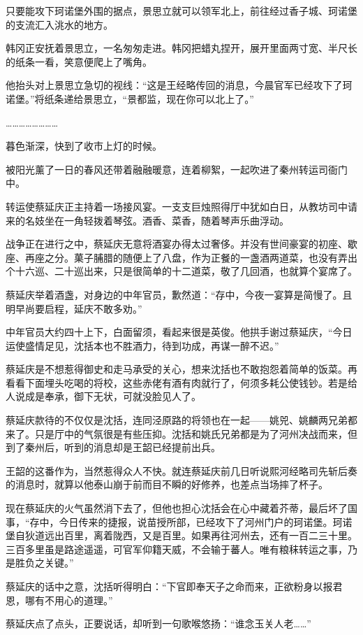 只要能攻下珂诺堡外围的据点，景思立就可以领军北上，前往经过香子城、珂诺堡的支流汇入洮水的地方。

韩冈正安抚着景思立，一名匆匆走进。韩冈把蜡丸捏开，展开里面两寸宽、半尺长的纸条一看，笑意便爬上了嘴角。

他抬头对上景思立急切的视线：“这是王经略传回的消息，今晨官军已经攻下了珂诺堡。”将纸条递给景思立，“景都监，现在你可以北上了。”

……………………

暮色渐深，快到了收市上灯的时候。

被阳光薰了一日的春风还带着融融暖意，连着柳絮，一起吹进了秦州转运司衙门中。

转运使蔡延庆正主持着一场接风宴。一支支巨烛照得厅中犹如白日，从教坊司中请来的名妓坐在一角轻拨着琴弦。酒香、菜香，随着琴声乐曲浮动。

战争正在进行之中，蔡延庆无意将酒宴办得太过奢侈。并没有世间豪宴的初座、歇座、再座之分。菓子脯腊的随便上了八盘，作为正餐的一盏酒两道菜，也没有弄出个十六巡、二十巡出来，只是很简单的十二道菜，敬了几回酒，也就算个宴席了。

蔡延庆举着酒盏，对身边的中年官员，歉然道：“存中，今夜一宴算是简慢了。且明早尚要启程，延庆不敢多劝。”

中年官员大约四十上下，白面留须，看起来很是英俊。他拱手谢过蔡延庆，“今日运使盛情足见，沈括本也不胜酒力，待到功成，再谋一醉不迟。”

蔡延庆是不想惹得御史和走马承受的关心，想来沈括也不敢抱怨着简单的饭菜。再看看下面埋头吃喝的将校，这些赤佬有酒有肉就行了，何须多耗公使钱钞。若是给人说成是奉承，御下无状，可就没脸见人了。

蔡延庆款待的不仅仅是沈括，连同泾原路的将领也在一起——姚兕、姚麟两兄弟都来了。只是厅中的气氛很是有些压抑。沈括和姚氏兄弟都是为了河州决战而来，但到了秦州后，听到的消息却是王韶已经提前出兵。

王韶的这番作为，当然惹得众人不快。就连蔡延庆前几日听说熙河经略司先斩后奏的消息时，就算以他泰山崩于前而目不瞬的好修养，也差点当场摔了杯子。

现在蔡延庆的火气虽然消下去了，但他也担心沈括会在心中藏着芥蒂，最后坏了国事，“存中，今日传来的捷报，说苗授所部，已经攻下了河州门户的珂诺堡。珂诺堡自狄道远出百里，离着陇西，又是百里。如果再往河州去，还有一百二三十里。三百多里虽是路途遥遥，可官军仰籍天威，不会输于蕃人。唯有粮秣转运之事，乃是胜负之关键。”

蔡延庆的话中之意，沈括听得明白：“下官即奉天子之命而来，正欲粉身以报君恩，哪有不用心的道理。”

蔡延庆点了点头，正要说话，却听到一句歌喉悠扬：“谁念玉关人老……”

